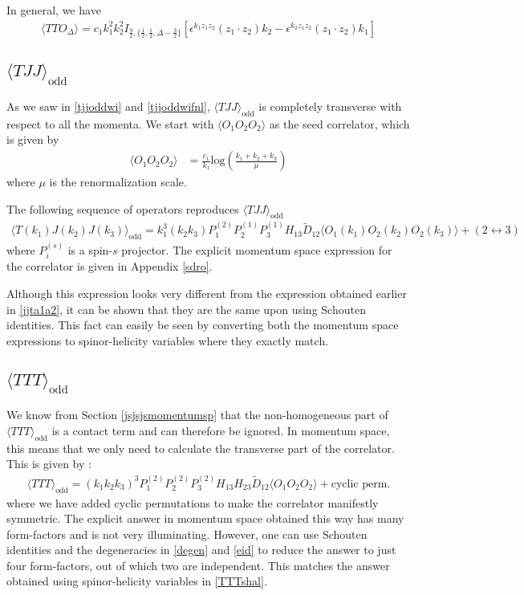 \documentclass[a4paper,11pt]{article}
\begin{document}
In general, we have
\begin{align}
    \langle TTO_{\Delta} \rangle = c_1k_1^2k_2^2 I_{\frac{9}{2},\{\frac{1}{2},\frac{1}{2},\Delta-\frac{3}{2}\}}\left[\epsilon^{k_1 z_1 z_2}(z_1 \cdot z_2)k_2-\epsilon^{k_2 z_1 z_2}(z_1 \cdot z_2)k_1\right]
\end{align}
\subsection{$\langle TJJ \rangle_{\text{odd}}$}
As we saw in \eqref{tjjoddwi} and \eqref{tjjoddwifnl}, $\langle TJJ \rangle_{\text{odd}}$ is completely transverse with respect to all the momenta. We start with $\langle O_1 O_2 O_2\rangle$ as the seed correlator, which is given by
\begin{align}
     \langle O_1 O_2 O_2 \rangle &= \frac{c_1}{k_1} \text{log}\left(\frac{k_1+k_2+k_3}{\mu}\right)
\end{align}
where $\mu$ is the renormalization scale.
\par
The following sequence of operators reproduces $\langle TJJ \rangle_{\text{odd}}$
\begin{align}
    \langle T(k_1)J(k_2)J(k_3) \rangle_{\text{odd}} = k_1^3 (k_2 k_3)P_1^{(2)}P_2^{(1)}P_3^{(1)}H_{13}\widetilde{D}_{12}\langle O_1(k_1)O_2(k_2)O_2(k_3) \rangle+(2 \leftrightarrow 3)
\end{align}
where $P_i^{(s)}$ is a spin-$s$ projector. 
The explicit momentum space expression for the correlator is given in Appendix \ref{sdro}.

Although this expression looks very different from the expression obtained earlier in \eqref{jjta1a2}, it can be shown that they are the same upon using Schouten identities. This fact can easily be seen by converting both the momentum space expressions to spinor-helicity variables where they exactly match. 
\subsection{$\langle TTT \rangle_{\text{odd}}$}
We know from Section \ref{jsjsjsmomentumsp} that the non-homogeneous part of $\langle TTT \rangle_{\text{odd}}$ is a contact term and can therefore be ignored. In momentum space, this means that we only need to calculate the transverse part of the correlator. This is given by :
\begin{align}
    \langle TTT \rangle_{\text{odd}} = (k_1 k_2 k_3)^3P_1^{(2)}P_2^{(2)}P_3^{(2)}H_{13}H_{23}\widetilde{D}_{12}\langle O_1 O_2 O_2 \rangle +\text{cyclic perm.}
\end{align}
where we have added cyclic permutations to make the correlator manifestly symmetric. The explicit answer in momentum space obtained this way has many form-factors and is not very illuminating. However, one can use Schouten identities and the degeneracies in \eqref{degen} and \eqref{eid} to reduce the answer to just four form-factors, out of which two are independent. This matches the answer obtained using spinor-helicity variables in \eqref{TTTshal}. 
\end{document}
